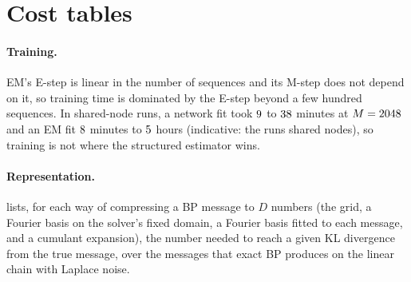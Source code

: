 \section{Cost tables}
\label{app:cost}



\paragraph{Training.}
EM's E-step is linear in the number of sequences and its M-step does not depend on it, so training time is dominated by the E-step beyond a few hundred sequences.
In shared-node runs, a network fit took $9$ to $38$ minutes at $M=2048$ and an EM fit $8$ minutes to $5$ hours (indicative:
the runs shared nodes), so training is not where the structured estimator wins.

\paragraph{Representation.}
 lists, for each way of compressing a BP message to $D$ numbers (the grid, a Fourier basis on the solver's fixed domain, a Fourier basis
fitted to each message, and a cumulant expansion), the number needed to reach a given KL divergence from the true message, over the messages that exact BP produces on the linear chain with Laplace noise.


